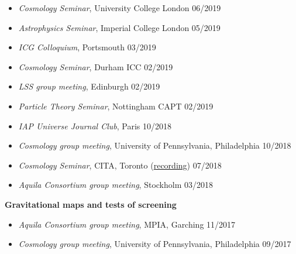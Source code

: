 \documentclass[11pt]{article}
\newenvironment{outerlist}[1][\enskip\textbullet]%
        {\begin{itemize}[#1]}{\end{itemize}%
         \vspace{-.6\baselineskip}}
\newcommand{\blankline}{\quad\pagebreak[2]}
\begin{document}
\begin{outerlist}
\item[] \textit{Cosmology Seminar}, University College London \hfill 06/2019 \\
\vspace{-1.4\baselineskip}
\item[] \textit{Astrophysics Seminar}, Imperial College London \hfill 05/2019 \\
\vspace{-1.4\baselineskip}
\item[] \textit{ICG Colloquium}, Portsmouth \hfill 03/2019 \\
\vspace{-1.4\baselineskip}
\item[] \textit{Cosmology Seminar}, Durham ICC \hfill 02/2019 \\
\vspace{-1.4\baselineskip}
\item[] \textit{LSS group meeting}, Edinburgh \hfill 02/2019 \\
\vspace{-1.4\baselineskip}
\item[] \textit{Particle Theory Seminar}, Nottingham CAPT \hfill 02/2019 \\
\vspace{-1.4\baselineskip}
\item[] \textit{IAP Universe Journal Club}, Paris \hfill 10/2018 \\
\vspace{-1.4\baselineskip}
\item[] \textit{Cosmology group meeting}, University of Pennsylvania, Philadelphia \hfill 10/2018\\
\vspace{-1.4\baselineskip}
\item[] \textit{Cosmology Seminar}, CITA, Toronto (\href{https://www.youtube.com/watch?v=zUF7ciY2r84}{recording}) \hfill 07/2018 \\
\vspace{-1.4\baselineskip}
\item[] \textit{Aquila Consortium group meeting}, Stockholm \hfill 03/2018
\end{outerlist}

\blankline

\textbf{Gravitational maps and tests of screening} 
\vspace{-0.35\baselineskip}
\begin{outerlist}
\item[] \textit{Aquila Consortium group meeting}, MPIA, Garching \hfill 11/2017 \\
\vspace{-1.4\baselineskip}
\item[] \textit{Cosmology group meeting}, University of Pennsylvania, Philadelphia \hfill 09/2017
\end{outerlist}
\end{document}
